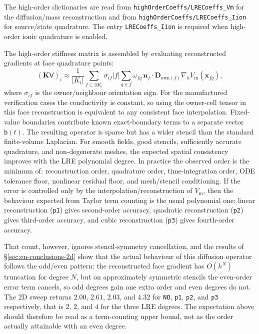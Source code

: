 \documentclass[11pt,a4paper]{article}
\newcommand{\code}[1]{\texttt{\small #1}}
\newcommand{\Vm}{V_{\text{m}}}
\newcommand{\Dten}{\mathbf{D}}
\newcommand{\grad}{\nabla}
\newcommand{\Kstif}{\mathbf{K}}
\begin{document}
The high-order dictionaries are read from
\code{highOrderCoeffs/LRECoeffs\_Vm} for the diffusion/mass reconstruction and
from \code{highOrderCoeffs/LRECoeffs\_Iion} for source/state quadrature. The
entry \code{LRECoeffs\_Iion} is required when high-order ionic quadrature is
enabled.

The high-order stiffness matrix is assembled by evaluating reconstructed
gradients at face quadrature points:
\begin{equation}
  (\Kstif\mathsf{V})_i
  \approx
  \frac{1}{|K_i|}
  \sum_{f\subset\partial K_i}\sigma_{if}
  |f|\sum_{q\in f}\omega_{fq}\,
  \mathbf{n}_f\cdot\Dten_{\mathrm{own}(f)}
  \grad_h \Vm(\mathbf{x}_{fq}),
  \label{eq:ho-face}
\end{equation}
where $\sigma_{if}$ is the owner/neighbour orientation sign. For the
manufactured verification cases the conductivity is constant, so using the
owner-cell tensor in this face reconstruction is equivalent to any consistent
face interpolation. Fixed-value boundaries contribute known exact-boundary
terms to a separate vector $\mathsf{b}(t)$.
The resulting operator is sparse but has a wider stencil than the standard
finite-volume Laplacian. For smooth fields, good stencils, sufficiently accurate
quadrature, and non-degenerate meshes, the expected spatial consistency improves
with the LRE polynomial degree. In practice the observed order is the minimum
of: reconstruction order, quadrature order, time-integration order, ODE
tolerance floor, nonlinear residual floor, and mesh/stencil conditioning.
If the error is controlled only by the interpolation/reconstruction of $\Vm$,
then the behaviour expected from Taylor term counting is the usual polynomial
one: linear reconstruction (\code{p1}) gives second-order accuracy, quadratic
reconstruction (\code{p2}) gives third-order accuracy, and cubic
reconstruction (\code{p3}) gives fourth-order accuracy.

That count, however, ignores stencil-symmetry cancellation, and the results of
\S\ref{sec:en-conclusions-2d} show that the actual behaviour of this diffusion
operator follows the odd/even pattern: the reconstructed face gradient has
$O(h^N)$ truncation for degree $N$, but on approximately symmetric stencils the
even-order error term cancels, so odd degrees gain one extra order and even
degrees do not. The 2D sweep returns $2.00$, $2.61$, $2.03$, and $4.32$ for
\code{NO}, \code{p1}, \code{p2}, and \code{p3} respectively, that is $2$, $2$,
and $4$ for the three LRE degrees. The expectation above should therefore be
read as a term-counting upper bound, not as the order actually attainable with
an even degree.
\end{document}
